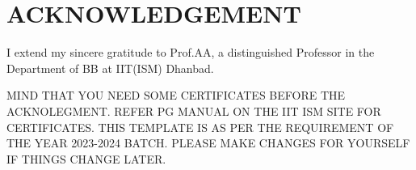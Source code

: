 \chapter*{ACKNOWLEDGEMENT}
I extend my sincere gratitude to Prof.AA, a distinguished Professor in the Department of BB at IIT(ISM) Dhanbad. 

MIND THAT YOU NEED SOME CERTIFICATES BEFORE THE ACKNOLEGMENT. REFER PG MANUAL ON THE IIT ISM SITE FOR CERTIFICATES. 
THIS TEMPLATE IS AS PER THE REQUIREMENT OF THE YEAR 2023-2024 BATCH. PLEASE MAKE CHANGES FOR YOURSELF IF THINGS CHANGE LATER.
\newpage